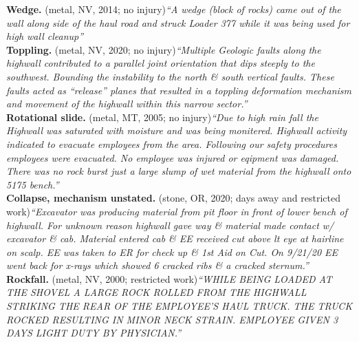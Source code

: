 \textbf{Wedge.} (metal, NV, 2014; no injury)\newline \textit{``A wedge (block of rocks) came out of the wall along side of the haul road and struck Loader 377 while it was being used for high wall cleanup''} \\
\midrule
\textbf{Toppling.} (metal, NV, 2020; no injury)\newline \textit{``Multiple Geologic faults along the highwall contributed to a parallel joint orientation that dips steeply to the southwest. Bounding the instability to the north \& south vertical faults. These faults acted as ``release'' planes that resulted in a toppling deformation mechanism and movement of the highwall within this narrow sector.''} \\
\midrule
\textbf{Rotational slide.} (metal, MT, 2005; no injury)\newline \textit{``Due to high rain fall the Highwall was saturated with moisture and was being monitered.  Highwall activity indicated to evacuate employees from the area. Following our safety procedures employees were evacuated. No employee was injured or eqipment was damaged. There was no rock burst just a large slump of wet material from the highwall onto 5175 bench.''} \\
\midrule
\textbf{Collapse, mechanism unstated.} (stone, OR, 2020; days away and restricted work)\newline \textit{``Excavator was producing material from pit floor in front of lower bench of highwall. For unknown reason highwall gave way \& material made contact w/ excavator \& cab. Material entered cab \& EE received cut above lt eye at hairline on scalp. EE was taken to ER for check up \& 1st Aid on Cut. On 9/21/20 EE went back for x-rays which showed 6 cracked ribs \& a cracked sternum.''} \\
\midrule
\textbf{Rockfall.} (metal, NV, 2000; restricted work)\newline \textit{``WHILE BEING LOADED AT THE SHOVEL A LARGE ROCK ROLLED FROM THE HIGHWALL STRIKING THE REAR OF THE EMPLOYEE'S HAUL TRUCK. THE TRUCK ROCKED RESULTING IN MINOR NECK STRAIN. EMPLOYEE GIVEN 3 DAYS LIGHT DUTY BY PHYSICIAN.''} \\
